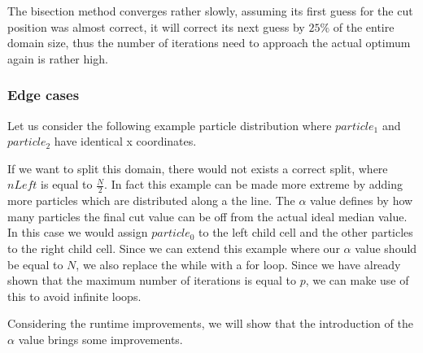 \documentclass[]{article}
\begin{document}
The bisection method converges rather slowly, assuming its first guess for the cut position was almost correct, it will correct its next guess by $25\%$ of the entire domain size, thus the number of iterations need to approach the actual optimum again is rather high.  

\subsubsection{Edge cases}

Let us consider the following example particle distribution where $particle_1$ and $particle_2$ have identical x coordinates. 

\begin{figure}[H]
	\begin{center}
	\end{center}
\end{figure}

If we want to split this domain, there would not exists a correct split, where $nLeft$ is equal to $\frac{N}{2}$. In fact this example can be made more extreme by adding more particles which are distributed along a the line.
The $\alpha$ value defines by how many particles the final cut value can be off from the actual ideal median value. In this case we would assign $particle_0$ to the left child cell and the other particles to the right child cell. Since we can extend this example where our $\alpha$ value should be equal to $N$, we also replace the while with a for loop. Since we have already shown that the maximum number of iterations is equal to $p$, we can make use of this to avoid infinite loops. 

Considering the runtime improvements, we will show that the introduction of the $\alpha$ value brings some improvements. 
\end{document}
